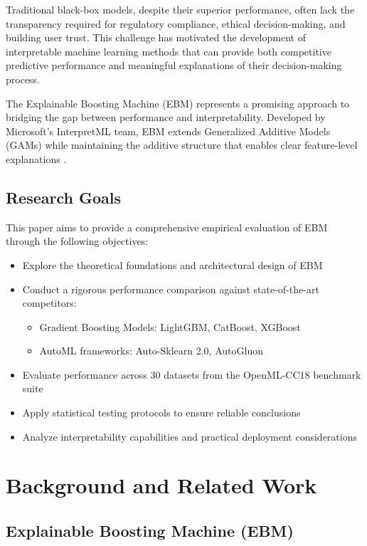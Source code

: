 \documentclass[12pt]{article}
\begin{document}
Traditional black-box models, despite their superior performance, often lack the transparency required for regulatory compliance, ethical decision-making, and building user trust. This challenge has motivated the development of interpretable machine learning methods that can provide both competitive predictive performance and meaningful explanations of their decision-making process.

The Explainable Boosting Machine (EBM) represents a promising approach to bridging the gap between performance and interpretability. Developed by Microsoft's InterpretML team, EBM extends Generalized Additive Models (GAMs) while maintaining the additive structure that enables clear feature-level explanations \cite{lou2013}.

\subsection{Research Goals}

This paper aims to provide a comprehensive empirical evaluation of EBM through the following objectives:

\begin{itemize}
\item Explore the theoretical foundations and architectural design of EBM
\item Conduct a rigorous performance comparison against state-of-the-art competitors:
  \begin{itemize}
  \item Gradient Boosting Models: LightGBM, CatBoost, XGBoost
  \item AutoML frameworks: Auto-Sklearn 2.0, AutoGluon
  \end{itemize}
\item Evaluate performance across 30 datasets from the OpenML-CC18 benchmark suite
\item Apply statistical testing protocols to ensure reliable conclusions
\item Analyze interpretability capabilities and practical deployment considerations
\end{itemize}

\section{Background and Related Work}

\subsection{Explainable Boosting Machine (EBM)}
\end{document}
